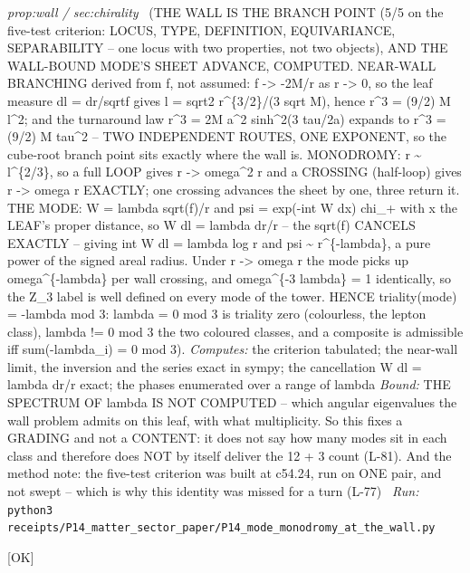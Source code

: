 \begin{description}
\textit{prop:wall / sec:chirality} \ (THE WALL IS THE BRANCH POINT (5/5 on the five-test criterion: LOCUS, TYPE, DEFINITION, EQUIVARIANCE, SEPARABILITY -- one locus with two properties, not two objects), AND THE WALL-BOUND MODE'S SHEET ADVANCE, COMPUTED. NEAR-WALL BRANCHING derived from f, not assumed: f -> -2M/r as r -> 0, so the leaf measure dl = dr/sqrt\textbar{}f\textbar{} gives l = sqrt2 r\textasciicircum{}\{3/2\}/(3 sqrt M), hence r\textasciicircum{}3 = (9/2) M l\textasciicircum{}2; and the turnaround law r\textasciicircum{}3 = 2M a\textasciicircum{}2 sinh\textasciicircum{}2(3 tau/2a) expands to r\textasciicircum{}3 = (9/2) M tau\textasciicircum{}2 -- TWO INDEPENDENT ROUTES, ONE EXPONENT, so the cube-root branch point sits exactly where the wall is. MONODROMY: r \textasciitilde{} l\textasciicircum{}\{2/3\}, so a full LOOP gives r -> omega\textasciicircum{}2 r and a CROSSING (half-loop) gives r -> omega r EXACTLY; one crossing advances the sheet by one, three return it. THE MODE: W = lambda sqrt(f)/r and psi = exp(-int W dx) chi\_+ with x the LEAF's proper distance, so W dl = lambda dr/r -- the sqrt(f) CANCELS EXACTLY -- giving int W dl = lambda log r and psi \textasciitilde{} r\textasciicircum{}\{-lambda\}, a pure power of the signed areal radius. Under r -> omega r the mode picks up omega\textasciicircum{}\{-lambda\} per wall crossing, and omega\textasciicircum{}\{-3 lambda\} = 1 identically, so the Z\_3 label is well defined on every mode of the tower. HENCE triality(mode) = -lambda mod 3: lambda = 0 mod 3 is triality zero (colourless, the lepton class), lambda != 0 mod 3 the two coloured classes, and a composite is admissible iff sum(-lambda\_i) = 0 mod 3). 
\emph{Computes:} the criterion tabulated; the near-wall limit, the inversion and the series exact in sympy; the cancellation W dl = lambda dr/r exact; the phases enumerated over a range of lambda
 \emph{Bound:} THE SPECTRUM OF lambda IS NOT COMPUTED -- which angular eigenvalues the wall problem admits on this leaf, with what multiplicity. So this fixes a GRADING and not a CONTENT: it does not say how many modes sit in each class and therefore does NOT by itself deliver the 12 + 3 count (L-81). And the method note: the five-test criterion was built at c54.24, run on ONE pair, and not swept -- which is why this identity was missed for a turn (L-77)
\ \emph{Run:} \texttt{python3 receipts/P14\_matter\_sector\_paper/P14\_mode\_monodromy\_at\_the\_wall.py}
\item[\rcptlabel{P14_dimension_from_flavour}{P14R50}\textbf{P14R50}\quad\texttt{P14\_dimension\_from\_flavour}]\hfill\textsf{[OK]}\\

\end{description}
